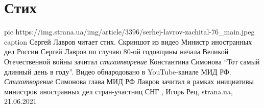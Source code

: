  
 
 
 
 
\chapter{Стих}
\label{sec:slova.stih}

\ifcmt
  pic https://img.strana.ua/img/article/3396/serhej-lavrov-zachital-76_main.jpeg
	caption Сергей Лавров читает стих. Скриншот из видео 
\fi
Министр иностранных дел России Сергей Лавров по случаю 80-ой годовщины начала
Великой Отечественной войны зачитал \emph{стихотворение} Константина Симонова
\enquote{Тот самый длинный день в году}.  Видео обнародовано в YouTube-канале
МИД РФ.  \emph{Стихотворение} Симонова глава МИД РФ Лавров зачитал в рамках
инициативы министров иностранных дел стран-участниц СНГ
, 
Игорь Рец, strana.ua, 21.06.2021
